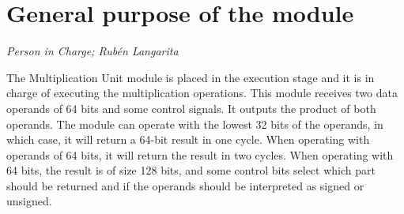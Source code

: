 \newpage
\section{General purpose of the module}
\textit{Person in Charge; Rubén Langarita}

The Multiplication Unit module is placed in the execution stage and it is in charge of executing the multiplication operations.
This module receives two data operands of 64 bits and some control signals.
It outputs the product of both operands.
The module can operate with the lowest 32 bits of the operands, in which case, it will return a 64-bit result in one cycle.
When operating with operands of 64 bits, it will return the result in two cycles.
When operating with 64 bits, the result is of size 128 bits, and some control bits select which part should be returned and if the operands should be interpreted as signed or unsigned.
